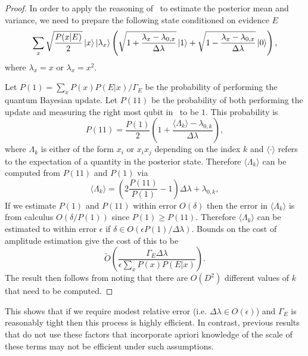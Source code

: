 \documentclass[aps,amsmath,onecolumn,amssymb]{revtex4}
\begin{document}
\begin{proof}
In order to apply the reasoning of~ to estimate the posterior mean and variance, we need to prepare the following state conditioned on evidence $E$
\begin{equation}
\sum_{x} \sqrt{\frac{P(x|E)}{2}} \left|x\right\rangle\left|\lambda_x\right\rangle\left(\sqrt{1+\frac{\lambda_x-\lambda_{0,x} }{\Delta \lambda}}\left|1\right\rangle + \sqrt{1-\frac{\lambda_x-\lambda_{0,x} }{\Delta \lambda}}\left|0\right\rangle \right),\label{eq:hadtest2}
\end{equation}
where $\lambda_x =x$ or $\lambda_x =x^2$.

Let $P(1)= \sum_x P(x) P(E|x)/\Gamma_E$ be the probability of performing the quantum Bayesian update.  Let $P(11)$ be the probability of both performing the update and measuring the right most qubit in~ to be $1$.  This probability is
\begin{equation}
P(11) = \frac{P(1)}{2}\left(1+\frac{\langle \Lambda_k \rangle -\lambda_{0,k}}{\Delta \lambda} \right),
\end{equation}
where $\Lambda_k$ is either of the form $x_i$ or $x_ix_j$ depending on the index $k$ and $\langle \cdot \rangle$ refers to the expectation of a quantity in the posterior state.
Therefore $\langle \Lambda_k \rangle$ can be computed from $P(11)$ and $P(1)$ via
\begin{equation}
\langle \Lambda_k \rangle = \left(2\frac{P(11)}{P(1)}-1 \right)\Delta \lambda + \lambda_{0,k},
\end{equation}
If we estimate $P(1)$ and $P(11)$ within error $O(\delta)$ then the error in $\langle \Lambda_k \rangle$ is from calculus $O(\delta/P(1))$ since $P(1)\ge P(11)$.  Therefore $\langle \Lambda_k \rangle$ can be estimated to within error $\epsilon$ if $\delta \in O(\epsilon P(1) /\Delta \lambda)$.  Bounds on the cost of amplitude estimation give the cost of this to be~\cite{BHM+02}
\begin{equation}
\tilde{O} \left(\frac{\Gamma_E \Delta \lambda}{\epsilon \sum_x P(x) P(E|x)} \right).
\end{equation}
The result then follows from noting that there are $O(D^2)$ different values of $k$ that need to be computed.
\end{proof}
This shows that if we require modest relative error (i.e. $\Delta \lambda \in O(\epsilon)$) and $\Gamma_E$ is reasonably tight then this process is highly efficient.  In contrast, previous results that do not use these factors that incorporate apriori knowledge of the scale of these terms may not be efficient under such assumptions.
\end{document}
